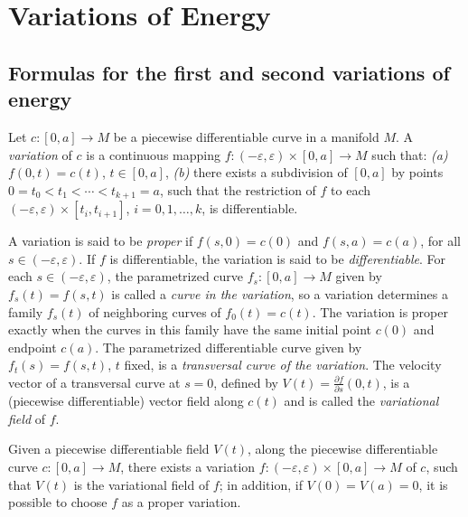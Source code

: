 \chapter{Variations of Energy}
\label{chap:dc-variations-of-energy}
\section{Formulas for the first and second variations of energy}

\begin{definition}[variation]
  \label{def:dc-ch9-2-1}
  Let $c:[0,a]\to M$ be a piecewise differentiable curve in a manifold $M$. A
  \emph{variation} of $c$ is a continuous mapping $f:(-\varepsilon,\varepsilon)\times[0,a]\to M$
  such that:
  \emph{(a)} $f(0,t)=c(t)$, $t\in[0,a]$,
  \emph{(b)} there exists a subdivision of $[0,a]$ by points
  $0=t_0<t_1<\cdots<t_{k+1}=a$, such that the restriction of $f$ to each
  $(-\varepsilon,\varepsilon)\times[t_i,t_{i+1}]$, $i=0,1,\dots,k$, is differentiable.

  A variation is said to be \emph{proper} if $f(s,0)=c(0)$ and $f(s,a)=c(a)$, for all
  $s\in(-\varepsilon,\varepsilon)$. If $f$ is differentiable, the variation is said to be
  \emph{differentiable}. For each $s\in(-\varepsilon,\varepsilon)$, the parametrized curve
  $f_s:[0,a]\to M$ given by $f_s(t)=f(s,t)$ is called a \emph{curve in the variation}, so
  a variation determines a family $f_s(t)$ of neighboring curves of $f_0(t)=c(t)$.
  The variation is proper exactly when the curves in this family have the same
  initial point $c(0)$ and endpoint $c(a)$.
  The parametrized differentiable curve given by $f_t(s)=f(s,t)$, $t$ fixed, is a
  \emph{transversal curve of the variation}. The velocity vector of a transversal curve
  at $s=0$, defined by $V(t)=\frac{\partial f}{\partial s}(0,t)$, is a (piecewise
  differentiable) vector field along $c(t)$ and is called the \emph{variational field} of
  $f$.
\end{definition}
\begin{proposition}
  \label{prop:dc-ch9-2-2}
  Given a piecewise differentiable field $V(t)$, along the piecewise differentiable
  curve $c:[0,a]\to M$, there exists a variation $f:(-\varepsilon,\varepsilon)\times[0,a]\to M$
  of $c$, such that $V(t)$ is the variational field of $f$; in addition, if
  $V(0)=V(a)=0$, it is possible to choose $f$ as a proper variation.
\end{proposition}
